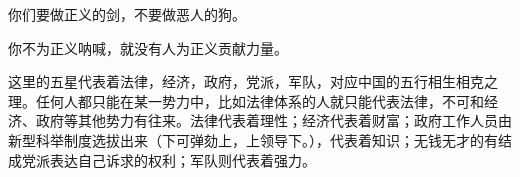 \documentclass[11pt,oneside]{book}
\begin{document}
\begin{common-format}

\usetikzlibrary{shapes,backgrounds}

\newcommand{\pentagram}[1]{%
\pgfmathsetmacro{\innerradius}{sin(90-72)/sin(90+72/2)}
\draw (#1:\innerradius)
\foreach \x in {1,...,5}
{ -- (#1+\x*72-72/2:1) -- (#1+\x*72:\innerradius)
}
-- cycle;
}

\vspace*{5pt}

\begin{center}
\end{center}

\vspace*{5pt}

\begin{center}
\end{center}

\vspace{5pt}

\begin{flushleft}
\end{flushleft}

\vspace{10pt}
\begin{center}
\Large\sffamily
你们要做正义的剑，不要做恶人的狗。

你不为正义呐喊，就没有人为正义贡献力量。
\end{center}

这里的五星代表着法律，经济，政府，党派，军队，对应中国的五行相生相克之理。任何人都只能在某一势力中，比如法律体系的人就只能代表法律，不可和经济、政府等其他势力有往来。法律代表着理性；经济代表着财富；政府工作人员由新型科举制度选拔出来（下可弹劾上，上领导下。），代表着知识；无钱无才的有结成党派表达自己诉求的权利；军队则代表着强力。


\end{common-format}
\end{document}
